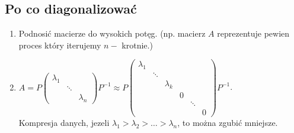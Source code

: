 \subsection{Po co diagonalizować}
\begin{enumerate} 
    \item Podnosić macierze do wysokich potęg. (np. macierz $A$ reprezentuje pewien proces który iterujemy 
        $n-$ krotnie.)
    \item $ A = P \begin{pmatrix} \lambda_1 & & \\ & \ddots & \\ & & \lambda_n \end{pmatrix} P^{-1} 
        \approx P \begin{pmatrix} \lambda_1 & & & & & \\ 
                                    & \ddots & & & & \\ 
                                    & & \lambda_k & & & \\ 
                                    & & & 0 & & \\ 
                                    & & & & \ddots & \\ 
                                    & & & & & 0 \end{pmatrix} P^{-1}$.\\ 
                                    Kompresja danych, jezeli $\lambda_1 > 
                                    \lambda_2 > \ldots > \lambda_n$, to można zgubić mniejsze.
\end{enumerate} 
